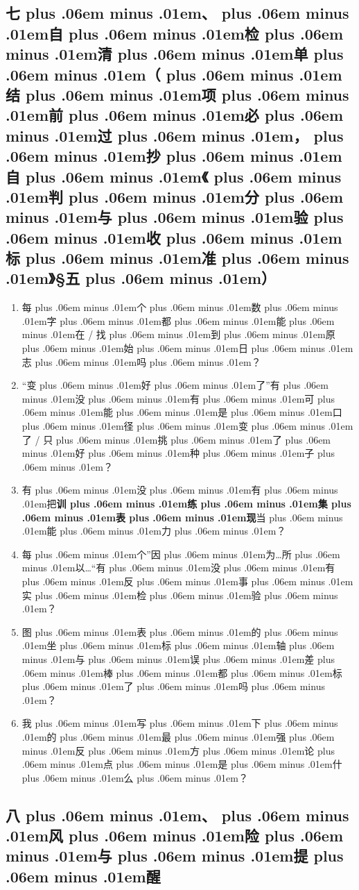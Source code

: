 \documentclass[
]{article}
\newcommand{\passthrough}[1]{#1}
\providecommand{\tightlist}{%
  \setlength{\itemsep}{0pt}\setlength{\parskip}{0pt}}
\def\zh#1{{\zhfont #1}}
\def\sym#1{{\symfont #1}}
\def\codezh#1{{\zhmonofont #1}}
\def\zhglue{\hskip0pt plus .06em minus .01em}
\begin{document}
\subsection{\zh{七\zhglue 、\zhglue 自\zhglue 检\zhglue 清\zhglue 单\zhglue （\zhglue 结\zhglue 项\zhglue 前\zhglue 必\zhglue 过\zhglue ，\zhglue 抄\zhglue 自\zhglue 《\zhglue 判\zhglue 分\zhglue 与\zhglue 验\zhglue 收\zhglue 标\zhglue 准\zhglue 》}\sym{§}\zh{五\zhglue ）}}\label{ux4e03ux81eaux68c0ux6e05ux5355ux7ed3ux9879ux524dux5fc5ux8fc7ux6284ux81eaux5224ux5206ux4e0eux9a8cux6536ux6807ux51c6ux4e94}

\begin{enumerate}
\def\labelenumi{\arabic{enumi}.}
\tightlist
\item
  \zh{每\zhglue 个\zhglue 数\zhglue 字\zhglue 都\zhglue 能\zhglue 在} \passthrough{\codezh{{\zh{证}}{\zh{据}}/}} \zh{找\zhglue 到\zhglue 原\zhglue 始\zhglue 日\zhglue 志\zhglue 吗\zhglue ？}
\item
  ``\zh{变\zhglue 好\zhglue 了}''\zh{有\zhglue 没\zhglue 有\zhglue 可\zhglue 能\zhglue 是\zhglue 口\zhglue 径\zhglue 变\zhglue 了} / \zh{只\zhglue 挑\zhglue 了\zhglue 好\zhglue 种\zhglue 子\zhglue ？}
\item
  \zh{有\zhglue 没\zhglue 有\zhglue 把}\textbf{\zh{训\zhglue 练\zhglue 集\zhglue 表\zhglue 现}}\zh{当\zhglue 能\zhglue 力\zhglue ？}
\item
  \zh{每\zhglue 个}''\zh{因\zhglue 为}\ldots \zh{所\zhglue 以}\ldots``\zh{有\zhglue 没\zhglue 有\zhglue 反\zhglue 事\zhglue 实\zhglue 检\zhglue 验\zhglue ？}
\item
  \zh{图\zhglue 表\zhglue 的\zhglue 坐\zhglue 标\zhglue 轴\zhglue 与\zhglue 误\zhglue 差\zhglue 棒\zhglue 都\zhglue 标\zhglue 了\zhglue 吗\zhglue ？}
\item
  \zh{我\zhglue 写\zhglue 下\zhglue 的\zhglue 最\zhglue 强\zhglue 反\zhglue 方\zhglue 论\zhglue 点\zhglue 是\zhglue 什\zhglue 么\zhglue ？}
\end{enumerate}

\subsection{\zh{八\zhglue 、\zhglue 风\zhglue 险\zhglue 与\zhglue 提\zhglue 醒}}\label{ux516bux98ceux9669ux4e0eux63d0ux9192-9}
\end{document}
